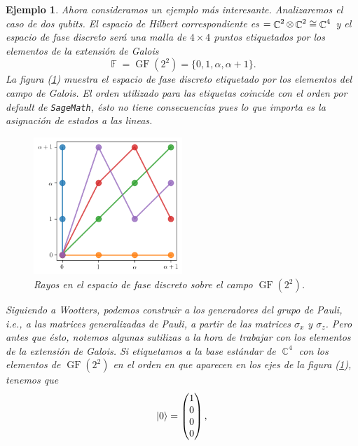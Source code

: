 \documentclass[a4paper]{report}
\DeclareMathOperator{\C}{\mathbb{C}}
\DeclareMathOperator{\F}{\mathbb{F}}
\let\H\relax
\DeclareMathOperator{\H}{\mathcal H}
\DeclareMathOperator{\GF}{GF}
\newtheorem{example}{Ejemplo}
\begin{document}
  \begin{example}
    Ahora consideramos un ejemplo más interesante.
    Analizaremos el caso de dos qubits. El espacio de
    Hilbert correspondiente es $\H = \C^2 \otimes \C^2 \cong
    \C^{4}$ y el espacio de fase discreto será una malla de
    $4 \times 4$ puntos etiquetados por los elementos de la
    extensión de Galois
    \[
      \F
      = \GF\left( 2^2 \right) 
      = \{0,1,\alpha,\alpha+1\}.
    \] 
    La figura (\ref{fig:wootters-affine-2-qubits}) muestra
    el espacio de fase discreto etiquetado por los elementos
    del campo de Galois. El orden utilizado para las
    etiquetas coincide con el orden por default de
    \texttt{SageMath}, ésto no tiene consecuencias pues lo
    que importa es la asignación de estados a las lineas.
    \begin{figure}[ht]
      \centering
      \includegraphics[width=0.5\textwidth]{imgs/affine-desargues-2-2.png}
      \caption{Rayos en el espacio de fase discreto sobre el
        campo $\GF\left( 2^2 \right)$.}
      \label{fig:wootters-affine-2-qubits}
    \end{figure}
    Siguiendo a Wootters, podemos construir a los
    generadores del grupo de Pauli, i.e., a las matrices
    generalizadas de Pauli, a partir de las matrices
    $\sigma_x$ y $\sigma_z$. Pero antes que ésto, notemos
    algunas sutilizas a la hora de trabajar con los
    elementos de la extensión de Galois. Si etiquetamos a la
    base estándar de $\C^{4}$ con los elementos de
    $\GF(2^2)$ en el orden en que aparecen en los ejes de la
    figura (\ref{fig:wootters-affine-2-qubits}), tenemos que
    \[
      \ket 0
      = \begin{pmatrix} 1\\0\\0\\0 \end{pmatrix},
\]
\end{example}
\end{document}
